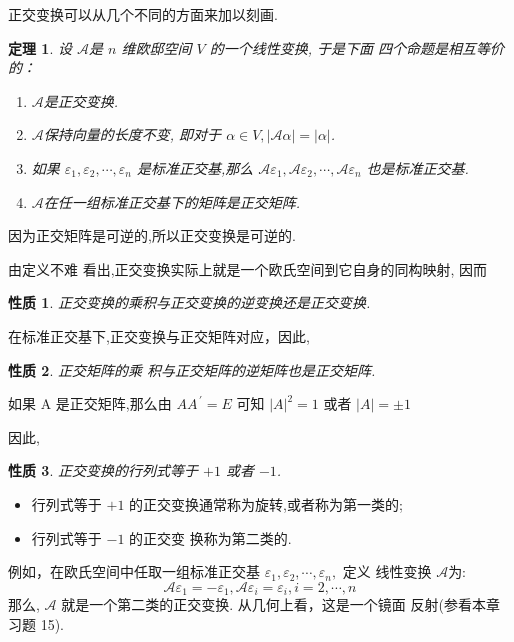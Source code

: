 \documentclass[13pt]{beamer}
\newtheorem{thm}{定理}
\newtheorem*{prop}{性质}
\begin{document}
\begin{frame}
正交变换可以从几个不同的方面来加以刻画.  

\begin{thm}
设 $\mathscr{A}$是 $n$ 维欧邸空间 $V$ 的一个线性变换, 于是下面 四个命题是相互等价的：
\begin{enumerate}
	\item $\mathscr{A}$是正交变换.
	\item $\mathscr{A}$保持向量的长度不变, 即对于 ${\alpha} \in V,|\mathscr{A} {\alpha}|=| {\alpha} |$.
	\item 如果 ${\varepsilon}_{1}, {\varepsilon}_{2}, \cdots, {\varepsilon}_{n}$ 是标准正交基,那么 $\mathscr{A} {\varepsilon}_{1}, \mathscr{A} {\varepsilon}_{2}, \cdots, \mathscr{A}{\varepsilon}_{n}$
	也是标准正交基.
	\item $\mathscr{A}$在任一组标准正交基下的矩阵是正交矩阵.
\end{enumerate}
\end{thm}

\end{frame}

\begin{frame}
因为正交矩阵是可逆的,所以正交变换是可逆的.

由定义不难 看出,正交变换实际上就是一个欧氏空间到它自身的同构映射, 因而
\begin{prop}
正交变换的乘积与正交变换的逆变换还是正交变换. 
\end{prop}


 在标准正交基下,正交变换与正交矩阵对应，因此,
\begin{prop}
正交矩阵的乘 积与正交矩阵的逆矩阵也是正交矩阵.  
\end{prop}
\end{frame}

\begin{frame}
如果 A 是正交矩阵,那么由
$
{A A}^{\, \prime}={E}
$
可知
$
|{A}|^{2}=1 \text { 或者 }|{A}|=\pm 1
$

因此,
\begin{prop}
正交变换的行列式等于 $+ 1$ 或者 $- 1$.
\end{prop}

\begin{itemize}
\item 行列式等于 $+1$ 的正交变换通常称为旋转,或者称为\alert{第一类}的;
\item 行列式等于 $- 1$ 的正交变 换称为\alert{第二类}的.  
\end{itemize}



例如，在欧氏空间中任取一组标准正交基 ${\varepsilon}_{1}, {\varepsilon}_{2}, \cdots, {\varepsilon}_{n},$ 定义
线性变换 $\mathscr{A}$为:
\[
\mathscr{A} {\varepsilon}_{1}=-{\varepsilon}_{1}, \mathscr{A} {\varepsilon}_{i}={\varepsilon}_{i}, i=2, \cdots, {n}
\]
那么, $\mathscr{A}$ 就是一个第二类的正交变换. 从几何上看，这是一个镜面 反射(参看本章习题 15). 
\end{frame}
\end{document}
